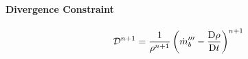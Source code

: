 \documentclass[11pt]{article}
\begin{document}
\paragraph{Divergence Constraint}

\begin{equation}
{\cal D}^{n+1} = \frac{1}{\rho^{n+1}}\left(\dot{m}_b^{\prime\prime\prime} - \frac{\mbox{D}\rho}{\mbox{D}t}\right)^{n+1}
\end{equation}


%
%
%
%
%
%

%
\end{document}
